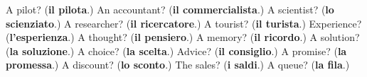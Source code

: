 \begin{tcolorbox}[breakable,colback=teal!4,colframe=teal!35!black,title={Before you move on}]
A pilot? (\textbf{il pilota}.) An accountant? (\textbf{il commercialista}.) A scientist? (\textbf{lo scienziato}.) A researcher? (\textbf{il ricercatore}.) A tourist? (\textbf{il turista}.) Experience? (\textbf{l'esperienza}.) A thought? (\textbf{il pensiero}.) A memory? (\textbf{il ricordo}.) A solution? (\textbf{la soluzione}.) A choice? (\textbf{la scelta}.) Advice? (\textbf{il consiglio}.) A promise? (\textbf{la promessa}.) A discount? (\textbf{lo sconto}.) The sales? (\textbf{i saldi}.) A queue? (\textbf{la fila}.)
\end{tcolorbox}
